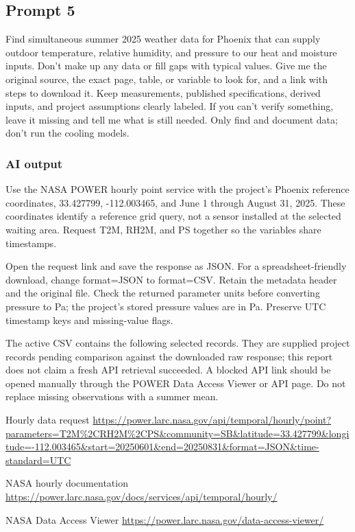 \subsection*{Prompt 5}
Find simultaneous summer 2025 weather data for Phoenix that can supply outdoor temperature, relative humidity, and pressure to our heat and moisture inputs. Don’t make up any data or fill gaps with typical values. Give me the original source, the exact page, table, or variable to look for, and a link with steps to download it. Keep measurements, published specifications, derived inputs, and project assumptions clearly labeled. If you can’t verify something, leave it missing and tell me what is still needed. Only find and document data; don’t run the cooling models.

\subsubsection*{AI output}
Use the NASA POWER hourly point service with the project’s Phoenix reference coordinates, 33.427799, -112.003465, and June 1 through August 31, 2025. These coordinates identify a reference grid query, not a sensor installed at the selected waiting area. Request T2M, RH2M, and PS together so the variables share timestamps.

Open the request link and save the response as JSON. For a spreadsheet-friendly download, change format=JSON to format=CSV. Retain the metadata header and the original file. Check the returned parameter units before converting pressure to Pa; the project’s stored pressure values are in Pa. Preserve UTC timestamp keys and missing-value flags.

The active CSV contains the following selected records. They are supplied project records pending comparison against the downloaded raw response; this report does not claim a fresh API retrieval succeeded. A blocked API link should be opened manually through the POWER Data Access Viewer or API page. Do not replace missing observations with a summer mean.

Hourly data request  \url{https://power.larc.nasa.gov/api/temporal/hourly/point?parameters=T2M%2CRH2M%2CPS&community=SB&latitude=33.427799&longitude=-112.003465&start=20250601&end=20250831&format=JSON&time-standard=UTC}

NASA hourly documentation  \url{https://power.larc.nasa.gov/docs/services/api/temporal/hourly/}

NASA Data Access Viewer  \url{https://power.larc.nasa.gov/data-access-viewer/}

